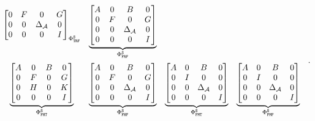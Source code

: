 \begin{equation}
\begin{matrix}
{\begin{bmatrix}
                    0 & F & 0 & G \\
                    0 & 0 & \Delta_{\mathcal{A}}& 0 \\
                    0 & 0 & 0 & I
                \end{bmatrix}}_{\Phi_{\texttt{T}\texttt{R}\texttt{F}}^{\texttt{S}}} &
                \underbrace{\begin{bmatrix}
                    A & 0 & B & 0 \\
                    0 & F & 0 & G \\
                    0 & 0 & \Delta_{\mathcal{A}} & 0 \\
                    0 & 0 & 0 & I
                \end{bmatrix}}_{\Phi_{\texttt{F}\texttt{R}\texttt{F}}^{\texttt{S}}} \\[4em]
                \underbrace{\begin{bmatrix}
                    A & 0 & B & 0 \\
                    0 & F & 0 & G \\
                    0 & H & 0 & K \\
                    0 & 0 & 0 & I
                \end{bmatrix}}_{\Phi_{\texttt{F}\texttt{H}\texttt{T}}^{\texttt{S}}} &
                \underbrace{\begin{bmatrix}
                    A & 0 & B & 0 \\
                    0 & F & 0 & G \\
                    0 & 0 & \Delta_{\mathcal{A}} & 0 \\
                    0 & 0 & 0 & I
                \end{bmatrix}}_{\Phi_{\texttt{F}\texttt{H}\texttt{F}}^{\texttt{S}}} &
                \underbrace{\begin{bmatrix}
                    A & 0 & B & 0 \\
                    0 & I & 0 & 0 \\
                    0 & 0 & \Delta_{\mathcal{A}} & 0 \\
                    0 & 0 & 0 & I
                \end{bmatrix}}_{\Phi_{\texttt{F}\texttt{M}\texttt{T}}^{\texttt{S}}} &
                \underbrace{\begin{bmatrix}
                    A & 0 & B & 0 \\
                    0 & I & 0 & 0 \\
                    0 & 0 & \Delta_{\mathcal{A}} & 0 \\
                    0 & 0 & 0 & I
                \end{bmatrix}}_{\Phi_{\texttt{F}\texttt{M}\texttt{F}}^{\texttt{S}}} &
            \end{matrix}.
    \end{equation}
%
